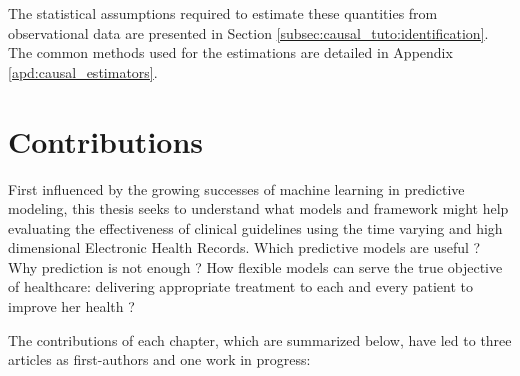 \documentclass[french,12pt,twoside,a4paper]{book}
\begin{document}
\begin{background_box_left}
  The statistical assumptions required to estimate these quantities from
  observational data are presented in Section
  \ref{subsec:causal_tuto:identification}. The common methods used for the
  estimations are detailed in Appendix \ref{apd:causal_estimators}.

\end{background_box_left}

\section{Contributions}\label{sec:intro:contributions}


First influenced by the growing successes of machine learning in predictive
modeling, this thesis seeks to understand what models and framework might help
evaluating the effectiveness of clinical guidelines using the time varying and
high dimensional Electronic Health Records. Which predictive models are useful ?
Why prediction is not enough ? How flexible models can serve the true
objective of healthcare: delivering appropriate treatment to each and every
patient to improve her health \citep{cma_policy_appropriateness_2015}?

The contributions of each chapter, which are summarized below, have led to three
articles as first-authors and one work in progress:
\end{document}
